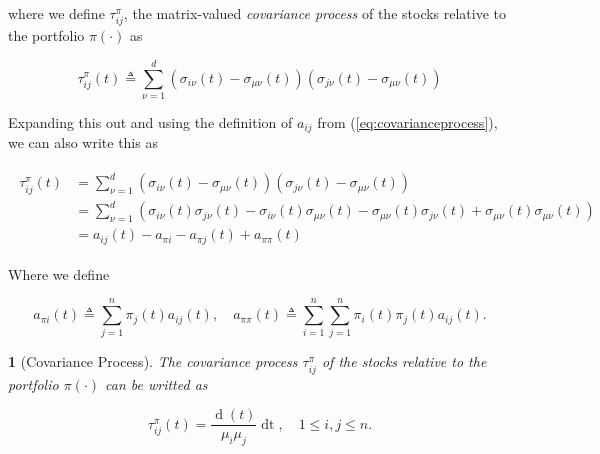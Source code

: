 \documentclass[british]{amsart} \usepackage{lmodern}
\numberwithin{equation}{section} \numberwithin{figure}{section}
\theoremstyle{plain} \newtheorem{thm}{\protect\theoremname}[section]
\theoremstyle{definition} \newtheorem{defn}[thm]{\protect\definitionname}
\theoremstyle{plain} \newtheorem{assumption}[thm]{\protect\assumptionname}
\theoremstyle{plain} \newtheorem{lem}[thm]{\protect\lemmaname}
\theoremstyle{plain} \newtheorem{prop}[thm]{\protect\propositionname}
\theoremstyle{remark} \newtheorem{rem}[thm]{\protect\remarkname}
\theoremstyle{plain} \newtheorem{cor}[thm]{\protect\corollaryname}
\renewcommand{\d}[1]{\mathop{\mathrm{d}{#1}}}
\newcommand{\defeq}{\mathop{\triangleq}} \newcommand{\almostsurely}{\text{a.s.}}
\begin{document}
where we define $\tau_{ij}^{\pi}$, the matrix-valued \textit{covariance process}
of the stocks relative to the portfolio $\pi(\cdot)$ as

\begin{equation}
  \label{eq:deftau}
  \tau_{ij}^{\pi}(t) \defeq
            \sum_{\nu=1}^{d}
            \left(
              \sigma_{i\nu}(t) - \sigma_{\mu\nu}(t)
            \right) 
            \left(
              \sigma_{j\nu}(t) - \sigma_{\mu\nu}(t)
            \right) 
\end{equation}

Expanding this out and using the definition of $a_{ij}$
from (\ref{eq:covarianceprocess}), we can also write this as

  \begin{gather}
    \begin{split}
      \tau_{ij}^{\pi}(t) 
        &=
            \sum_{\nu=1}^{d}
            \left(
              \sigma_{i\nu}(t) - \sigma_{\mu\nu}(t)
            \right) 
            \left(
              \sigma_{j\nu}(t) - \sigma_{\mu\nu}(t)
            \right) \\
        &=
            \sum_{\nu=1}^{d}
            \left(
              \sigma_{i\nu}(t)\sigma_{j\nu}(t) - \sigma_{i\nu}(t)\sigma_{\mu\nu}(t) -
              \sigma_{\mu\nu}(t)\sigma_{j\nu}(t) + \sigma_{\mu\nu}(t)\sigma_{\mu\nu}(t)
            \right) \\
        &= a_{ij}(t) - a_{\pi i} - a_{\pi j}(t) + a_{\pi\pi}(t)
   \end{split}
  \end{gather}

Where we define

  \begin{equation}
      a_{\pi i}(t) \defeq \sum_{j=1}^{n} \pi_{j}(t)a_{ij}(t), \quad 
      a_{\pi \pi}(t) \defeq \sum_{i=1}^{n} \sum_{j=1}^{n} \pi_{i}(t) \pi_{j}(t) a_{ij}(t).
  \end{equation}


\begin{lem} [Covariance Process]

The covariance process $\tau_{ij}^{\pi}$ of the stocks relative to the portfolio $\pi(\cdot)$ 
can be writted as

\begin{equation}
  \label{eq:tau}
  \tau_{ij}^{\pi}(t) = 
    \frac{ \d{\langle \mu_{i}, \mu_{j} \rangle}(t)}{ \mu_{i} \mu_{j}}\d{t},
    \quad 1 \le i,j \le n.
\end{equation}

\end{lem}
\end{document}
